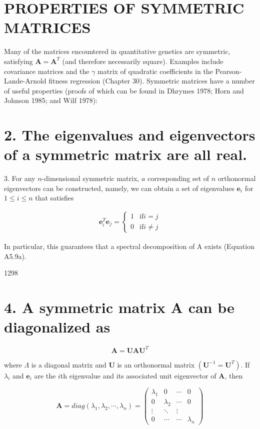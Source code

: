 \documentclass{article}
\begin{document}
\section{PROPERTIES OF SYMMETRIC MATRICES}
Many of the matrices encountered in quantitative genetics are symmetric, satisfying  $ \mathbf{A} = \mathbf{A}^T $ (and therefore necessarily square). Examples include covariance matrices and the  $ \gamma $ matrix of quadratic coefficients in the Pearson-Lande-Arnold fitness regression (Chapter 30). Symmetric matrices have a number of useful properties (proofs of which can be found in Dhrymes 1978; Horn and Johnson 1985; and Wilf 1978):

\section{2. The eigenvalues and eigenvectors of a symmetric matrix are all real.}
3. For any $n$-dimensional symmetric matrix, $a$ corresponding set of $n$ orthonormal eigenvectors can be constructed, namely, we can obtain a set of eigenvalues $\mathbf{e}_i$ for $1 \leq i \leq n$ that satisfies

\begin{equation}
\begin{align*}\mathbf{e}_i^T\mathbf{e}_j=\begin{cases}1&\textrm{if}i=j\\0&\textrm{if}i\neq j\end{cases}\end{align*}
\end{equation}

In particular, this guarantees that a spectral decomposition of A exists (Equation A5.9a).

1298

\section{4. A symmetric matrix A can be diagonalized as}
\begin{equation}
\mathbf{A}=\mathbf{U}\mathbf{A}\mathbf{U}^{T}
\end{equation}

where  $ \Lambda $ is a diagonal matrix and  $ \mathbf{U} $ is an orthonormal matrix  $ (\mathbf{U}^{-1} = \mathbf{U}^T) $. If  $ \lambda_i $ and  $ \mathbf{e}_i $ are the  $ i $th eigenvalue and its associated unit eigenvector of  $ \mathbf{A} $, then

\begin{equation}
\boldsymbol{A}=diag(\lambda_{1},\lambda_{2},\cdots,\lambda_{n})=\begin{pmatrix}{{{\lambda_{1}}}}&{{{0}}}&{{{\cdots}}}&{{{0}}} \\{{{0}}}&{{{\lambda_{2}}}}&{{{\cdots}}}&{{{0}}} \\{{{\vdots}}}&{{{\ddots}}}&{{{\vdots}}} \\{{{0}}}&{{{\cdots}}}&{{{\cdots}}}&{{{\lambda_{n}}}}\end{pmatrix}
\end{equation}
\end{document}
